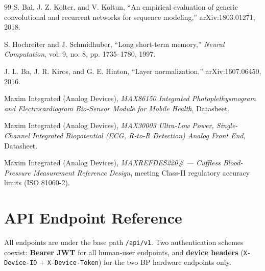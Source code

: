 \documentclass[12pt,a4paper]{report}
\begin{document}
\begin{thebibliography}{99}
 S. Bai, J. Z. Kolter, and V. Koltun,
``An empirical evaluation of generic convolutional and recurrent networks for
sequence modeling,'' arXiv:1803.01271, 2018.

 S. Hochreiter and J. Schmidhuber,
``Long short-term memory,'' \textit{Neural Computation}, vol. 9, no. 8,
pp. 1735--1780, 1997.

 J. L. Ba, J. R. Kiros, and G. E. Hinton,
``Layer normalization,'' arXiv:1607.06450, 2016.

 Maxim Integrated (Analog Devices),
\textit{MAX86150 Integrated Photoplethysmogram and Electrocardiogram Bio-Sensor
Module for Mobile Health}, Datasheet.

 Maxim Integrated (Analog Devices),
\textit{MAX30003 Ultra-Low Power, Single-Channel Integrated Biopotential (ECG,
R-to-R Detection) Analog Front End}, Datasheet.

 Maxim Integrated (Analog Devices),
\textit{MAXREFDES220\# --- Cuffless Blood-Pressure Measurement Reference
Design}, meeting Class-II regulatory accuracy limits (ISO 81060-2).
\end{thebibliography}


\appendix
\chapter{API Endpoint Reference}

All endpoints are under the base path \texttt{/api/v1}. Two authentication
schemes coexist: \textbf{Bearer JWT} for all human-user endpoints, and
\textbf{device headers} (\texttt{X-Device-ID} + \texttt{X-Device-Token}) for the
two BP hardware endpoints only.
\end{document}
